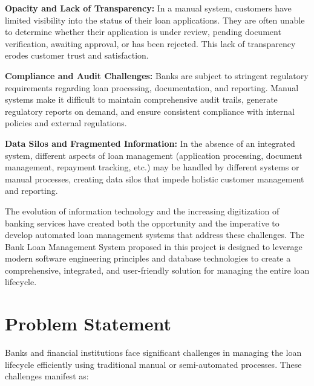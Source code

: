 \textbf{Opacity and Lack of Transparency:} In a manual system, customers have limited visibility into the status of their loan applications. They are often unable to determine whether their application is under review, pending document verification, awaiting approval, or has been rejected. This lack of transparency erodes customer trust and satisfaction.

\textbf{Compliance and Audit Challenges:} Banks are subject to stringent regulatory requirements regarding loan processing, documentation, and reporting. Manual systems make it difficult to maintain comprehensive audit trails, generate regulatory reports on demand, and ensure consistent compliance with internal policies and external regulations.

\textbf{Data Silos and Fragmented Information:} In the absence of an integrated system, different aspects of loan management (application processing, document management, repayment tracking, etc.) may be handled by different systems or manual processes, creating data silos that impede holistic customer management and reporting.

The evolution of information technology and the increasing digitization of banking services have created both the opportunity and the imperative to develop automated loan management systems that address these challenges. The Bank Loan Management System proposed in this project is designed to leverage modern software engineering principles and database technologies to create a comprehensive, integrated, and user-friendly solution for managing the entire loan lifecycle.

\section{Problem Statement}

Banks and financial institutions face significant challenges in managing the loan lifecycle efficiently using traditional manual or semi-automated processes. These challenges manifest as:

